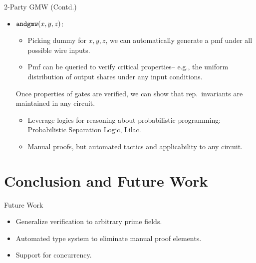 \documentclass{beamer}
\begin{document}
\begin{frame}
  
  \begin{exampleblock}{2-Party GMW (Contd.)}
    \begin{itemize}
    \item $\texttt{andgmw}(x,y,z)$:
      \begin{itemize}
      \item Picking dummy for $x,y,z$, we can automatically generate a
        pmf under all possible wire inputs.
      \item Pmf can be queried to verify critical properties-- e.g., the
        uniform distribution of output shares under any input conditions. 
      \end{itemize}
      Once properties of gates are verified, we can show that rep.~invariants
      are maintained in any circuit.
      \begin{itemize}
      \item Leverage logics for reasoning about probabilistic programming: Probabilistic
        Separation Logic, Lilac.
      \item Manual proofs, but automated tactics and applicability to any circuit.
      \end{itemize}
    \end{itemize}
    
  \end{exampleblock}
    
\end{frame}

\section{Conclusion and Future Work}


\begin{frame}{Future Work}

  \begin{itemize}
  \item Generalize verification to arbitrary prime fields.
  \item Automated type system to eliminate manual proof elements.
  \item Support for concurrency.
  \end{itemize}

\end{frame}
\end{document}
